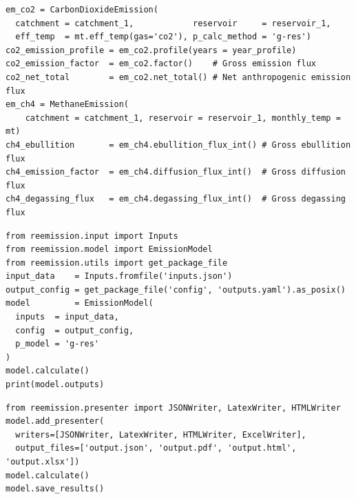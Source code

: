 \documentclass[review, authoryear, 1p]{elsarticle} %
\begin{document}
\begin{minipage}{\linewidth}
\begin{lstlisting}[language=PythonReemission, label={lst:em_calc}, caption={Use of Re-Emission as a library: calculation of CO$_2$ and CH$_4$ emissions using \texttt{CarbonDioxideEmission} and \texttt{MethaneEmission} classes.}]
em_co2 = CarbonDioxideEmission(
  catchment = catchment_1,            reservoir     = reservoir_1,
  eff_temp  = mt.eff_temp(gas='co2'), p_calc_method = 'g-res')
co2_emission_profile = em_co2.profile(years = year_profile)
co2_emission_factor  = em_co2.factor()    # Gross emission flux
co2_net_total        = em_co2.net_total() # Net anthropogenic emission flux
em_ch4 = MethaneEmission(
	catchment = catchment_1, reservoir = reservoir_1, monthly_temp = mt)
ch4_ebullition       = em_ch4.ebullition_flux_int() # Gross ebullition flux
ch4_emission_factor  = em_ch4.diffusion_flux_int()  # Gross diffusion flux
ch4_degassing_flux   = em_ch4.degassing_flux_int()  # Gross degassing flux
\end{lstlisting}
\end{minipage}

\begin{minipage}{\linewidth}
\begin{lstlisting}[language=PythonReemission, label={lst:em_calc_file}, caption={Use of Re-Emission as a library: calculation of reservoir emissions with inputs read from file using the \texttt{Input} class.}]
from reemission.input import Inputs
from reemission.model import EmissionModel
from reemission.utils import get_package_file
input_data    = Inputs.fromfile('inputs.json')
output_config = get_package_file('config', 'outputs.yaml').as_posix()
model         = EmissionModel(
  inputs  = input_data, 
  config  = output_config, 
  p_model = 'g-res'
)
model.calculate()
print(model.outputs)
\end{lstlisting}
\end{minipage}

\begin{minipage}{\linewidth}
\begin{lstlisting}[language=PythonReemission, label={lst:em_calc_presentation}, caption={Use of Re-Emission as a library: saving results in multiple file formats using the \texttt{Presenter} and \texttt{Writer} classes.}]
from reemission.presenter import JSONWriter, LatexWriter, HTMLWriter
model.add_presenter(
  writers=[JSONWriter, LatexWriter, HTMLWriter, ExcelWriter],
  output_files=['output.json', 'output.pdf', 'output.html', 'output.xlsx'])
model.calculate()
model.save_results()
\end{lstlisting}
\end{minipage}
\end{document}

